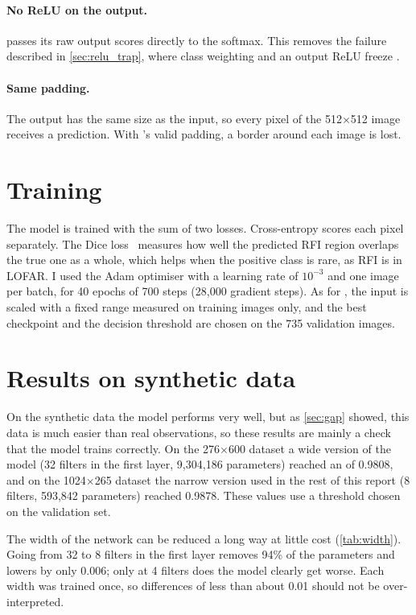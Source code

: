 \paragraph{No ReLU on the output.} \hybrid{} passes its raw output scores
directly to the softmax. This removes the failure described in
\cref{sec:relu_trap}, where class weighting and an output ReLU freeze
\tfunet{}.

\paragraph{Same padding.} The output has the same size as the input, so every
pixel of the 512$\times$512 image receives a prediction. With \tfunet{}'s valid
padding, a border around each image is lost.

\section{Training}
\label{sec:hybrid_training}
The model is trained with the sum of two losses. Cross-entropy scores each
pixel separately. The Dice loss~\cite{milletari2016} measures how well the
predicted RFI region overlaps the true one as a whole, which helps when the
positive class is rare, as RFI is in LOFAR. I used the Adam optimiser with a
learning rate of $10^{-3}$ and one image per batch, for 40 epochs of 700 steps
(28{,}000 gradient steps). As for \tfunet{}, the input is scaled with a fixed
range measured on training images only, and the best checkpoint and the
decision threshold are chosen on the 735 validation images.

\section{Results on synthetic data}
On the synthetic data the model performs very well, but as
\cref{sec:gap} showed, this data is much easier than real observations, so
these results are mainly a check that the model trains correctly.
On the 276$\times$600 dataset a wide version of the model (32 filters in the
first layer, 9{,}304{,}186 parameters) reached an \Fone{} of 0.9808, and on the
1024$\times$265 dataset the narrow version used in the rest of this report (8
filters, 593{,}842 parameters) reached 0.9878. These values use a threshold
chosen on the validation set.

The width of the network can be reduced a long way at little cost
(\cref{tab:width}). Going from 32 to 8 filters in the first layer removes 94\%
of the parameters and lowers \Fone{} by only 0.006; only at 4 filters does the
model clearly get worse. Each width was trained once, so differences of less
than about 0.01 should not be over-interpreted.

